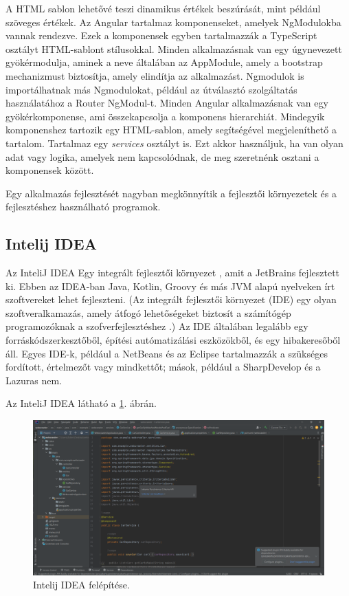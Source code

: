 A HTML sablon lehetővé teszi dinamikus értékek beszúrását, mint például szöveges értékek. Az Angular tartalmaz komponenseket, amelyek NgModulokba vannak rendezve. Ezek a komponensek egyben tartalmazzák a TypeScript osztályt HTML-sablont stílusokkal. Minden alkalmazásnak van egy úgynevezett gyökérmodulja, aminek a neve általában az AppModule, amely a bootstrap mechanizmust biztosítja, amely elindítja az alkalmazást. Ngmodulok is importálhatnak más Ngmodulokat, például az útválasztó szolgáltatás használatához a Router NgModul-t.  Minden Angular alkalmazásnak van egy gyökérkomponense, ami összekapcsolja a komponens hierarchiát. Mindegyik komponenshez tartozik egy HTML-sablon, amely segítségével megjeleníthető a tartalom. Tartalmaz egy \textit{services} osztályt is. Ezt akkor használjuk, ha van olyan adat vagy logika, amelyek nem kapcsolódnak, de meg szeretnénk osztani a komponensek között.


Egy alkalmazás fejlesztését nagyban megkönnyítik a fejlesztői környezetek és a fejlesztéshez használható programok.
\subsection{Intelij IDEA}

Az InteliJ IDEA \cite{Intelij} Egy integrált fejlesztői környezet \cite{Intelij2}, amit a JetBrains fejlesztett ki. Ebben az IDEA-ban Java, Kotlin, Groovy és más JVM alapú nyelveken írt szoftvereket lehet fejleszteni. (Az integrált fejlesztői környezet (IDE)  egy olyan  szoftveralkamazás, amely átfogó lehetőségeket biztosít a számítógép programozóknak a szofverfejlesztéshez .) Az IDE általában legalább egy forráskódszerkesztőből, építési autómatizálási eszközökből, és egy hibakeresőből áll. Egyes IDE-k, például a NetBeans és az Eclipse tartalmazzák a szükséges fordított, értelmezőt vagy mindkettőt; mások, például a SharpDevelop és a Lazuras nem.

Az InteliJ IDEA látható a \ref{fig:Intelij}. ábrán.

\begin{figure}[h]
\centering
\includegraphics[scale=1]{images/Intelij.png}
\caption{Intelij IDEA felépítése.}
\label{fig:Intelij}
\end{figure}

